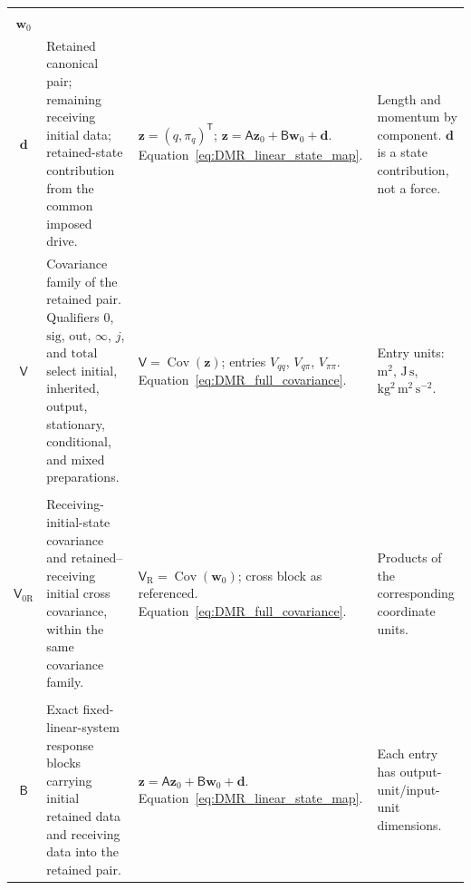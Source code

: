 \begin{longtable}{@{} c p{5.5cm} p{4cm} p{3.5cm} @{}}
\begin{tabular}[c]{@{}c@{}}$\mathbf z$ \\ $\mathbf w_0$ \\ $\mathbf d$\end{tabular} & {\raggedright Retained canonical pair; remaining receiving initial data; retained-state contribution from the common imposed drive.\par} & {\raggedright $\mathbf z=(q,\pi_q)^{\mathsf T}$; $\mathbf z=\mathsf A\mathbf z_0+\mathsf B\mathbf w_0+\mathbf d$. \newline Equation~\eqref{eq:DMR_linear_state_map}.\par} & {\raggedright Length and momentum by component. $\mathbf d$ is a state contribution, not a force.\par} \\

$\mathsf V$ & {\raggedright Covariance family of the retained pair. Qualifiers $0$, $\mathrm{sig}$, $\mathrm{out}$, $\infty$, $j$, and $\mathrm{total}$ select initial, inherited, output, stationary, conditional, and mixed preparations.\par} & {\raggedright $\mathsf V=\operatorname{Cov}(\mathbf z)$; entries $V_{qq}$, $V_{q\pi}$, $V_{\pi\pi}$. \newline Equation~\eqref{eq:DMR_full_covariance}.\par} & {\raggedright Entry units: $\mathrm{m^2}$, $\mathrm{J\,s}$, $\mathrm{kg^2\,m^2\,s^{-2}}$.\par} \\

\begin{tabular}[c]{@{}c@{}}$\mathsf V_{\mathrm R}$ \\ $\mathsf V_{0\mathrm R}$\end{tabular} & {\raggedright Receiving-initial-state covariance and retained--receiving initial cross covariance, within the same covariance family.\par} & {\raggedright $\mathsf V_{\mathrm R}=\operatorname{Cov}(\mathbf w_0)$; cross block as referenced. \newline Equation~\eqref{eq:DMR_full_covariance}.\par} & {\raggedright Products of the corresponding coordinate units.\par} \\

\begin{tabular}[c]{@{}c@{}}$\mathsf A$ \\ $\mathsf B$\end{tabular} & {\raggedright Exact fixed-linear-system response blocks carrying initial retained data and receiving data into the retained pair.\par} & {\raggedright $\mathbf z=\mathsf A\mathbf z_0+\mathsf B\mathbf w_0+\mathbf d$. \newline Equation~\eqref{eq:DMR_linear_state_map}.\par} & {\raggedright Each entry has output-unit/input-unit dimensions.\par} \\


\end{longtable}
